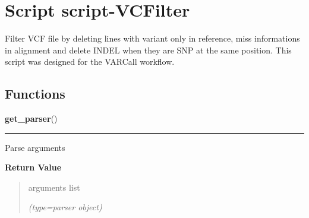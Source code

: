 %
%
%


\section{Script script-VCFilter}

    \label{script-VCFilter}
Filter VCF file by deleting lines with variant only in reference, miss 
informations in alignment and delete INDEL when they are SNP at the same 
position. This script was designed for the VARCall workflow.



  \subsection{Functions}

    \label{script-VCFilter:get_parser}

    \vspace{0.5ex}

\hspace{.8\funcindent}\begin{boxedminipage}{\funcwidth}

    \raggedright \textbf{get\_parser}()

    \vspace{-1.5ex}

    \rule{\textwidth}{0.5\fboxrule}
\setlength{\parskip}{2ex}
    Parse arguments

\setlength{\parskip}{1ex}
      \textbf{Return Value}
    \vspace{-1ex}

      \begin{quote}
      arguments list

      {\it (type=parser object)}

      \end{quote}

    \end{boxedminipage}

